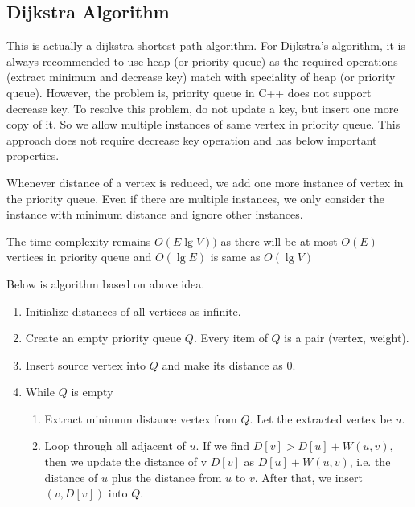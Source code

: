 \documentclass[a4paper,12pt]{article}
\begin{document}
\subsection{Dijkstra Algorithm}
This is actually a dijkstra shortest path algorithm. For Dijkstra's algorithm, it is always recommended to use heap (or priority queue) as the required operations (extract minimum and decrease key) match with speciality of heap (or priority queue). However, the problem is, priority queue in C++ does not support decrease key. To resolve this problem, do not update a key, but insert one more copy of it. So we allow multiple instances of same vertex in priority queue. This approach does not require decrease key operation and has below important properties.
\par
Whenever distance of a vertex is reduced, we add one more instance of vertex in the priority queue. Even if there are multiple instances, we only consider the instance with minimum distance and ignore other instances.
\par
The time complexity remains $O(E\lg V))$ as there will be at most $O(E)$ vertices in priority queue and $O(\lg E)$ is same as $O(\lg V)$
\par
Below is algorithm based on above idea.
\begin{enumerate}
    \item Initialize distances of all vertices as infinite.
    \item Create an empty priority queue $Q$.  Every item of $Q$ is a pair (vertex, weight). 
    \item Insert source vertex into $Q$ and make its distance as 0.
    \item While $Q$ is empty
    \begin{enumerate}
        \item Extract minimum distance vertex from $Q$. Let the extracted vertex be $u$.
        \item Loop through all adjacent of $u$. If we find $D[v] > D[u] + W(u, v)$, then we update the distance of v $D[v]$ as $D[u] + W(u,v)$, i.e. the distance of $u$ plus the distance from $u$ to $v$. After that, we insert $(v, D[v])$ into $Q$.
    \end{enumerate}
\end{enumerate}
\end{document}
